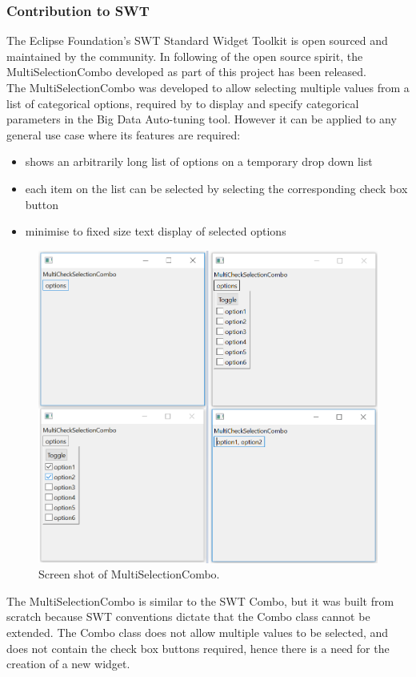 \subsubsection{Contribution to SWT}
The Eclipse Foundation's SWT Standard Widget Toolkit is open sourced and maintained by the community. In following of the open source spirit, the MultiSelectionCombo developed as part of this project has been released.\\
The MultiSelectionCombo was developed to allow selecting multiple values from a list of categorical options, required by to display and specify categorical parameters in the Big Data Auto-tuning tool. However it can be applied to any general use case where its features are required:
\begin{itemize}
\item shows an arbitrarily long list of options on a temporary drop down list
\item each item on the list can be selected by selecting the corresponding check box button
\item minimise to fixed size text display of selected options
\end{itemize}
\begin{figure}[h]
\centering
\caption{Screen shot of MultiSelectionCombo.}
\label{fig:screenshot}
\includegraphics[width=\textwidth]{images/screenshot.png}
\end{figure}
The MultiSelectionCombo is similar to the SWT Combo, but it was built from scratch because SWT conventions dictate that the Combo class cannot be extended. The Combo class does not allow multiple values to be selected, and does not contain the check box buttons required, hence there is a need for the creation of a new widget.\\
